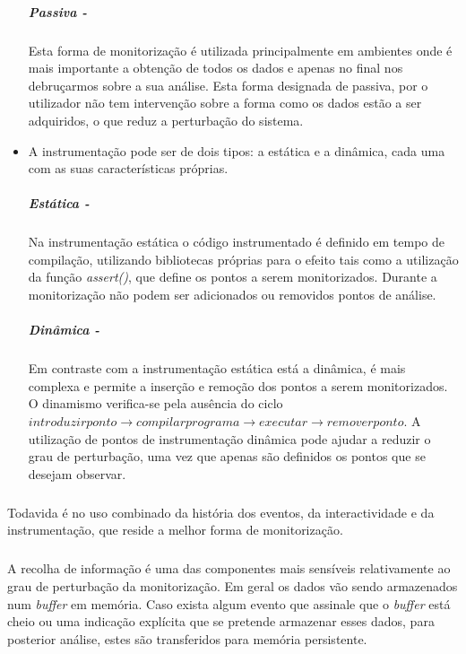 \begin{itemize}
\subparagraph*{Passiva - }
Esta forma de monitorização é utilizada principalmente em ambientes onde é mais importante a obtenção de todos os dados e apenas no final nos debruçarmos sobre a sua análise.
Esta forma designada de passiva, por o utilizador não tem intervenção sobre a forma como os dados estão a ser adquiridos, o que reduz a perturbação do sistema. 
\item

A instrumentação pode ser de dois tipos: a estática e a dinâmica, cada uma com as suas características próprias.

\subparagraph*{Estática - }

Na instrumentação estática o código instrumentado é definido em tempo de compilação, utilizando bibliotecas próprias para o efeito tais como a utilização da função \textit{assert()}, que define os pontos a serem monitorizados.
Durante a monitorização não podem ser adicionados ou removidos pontos de análise.

\subparagraph*{Dinâmica - }

Em contraste com a instrumentação estática está a dinâmica, é mais complexa e permite a inserção e remoção dos pontos a serem monitorizados.
O dinamismo verifica-se pela ausência do ciclo $introduzir ponto\rightarrow compilar programa\rightarrow executar\rightarrow remover ponto$.
A utilização de pontos de instrumentação dinâmica pode ajudar a reduzir o grau de perturbação, uma vez que apenas são definidos os pontos que se desejam observar.
\end{itemize}

\subparagraph*{}
Todavida é no uso combinado da história dos eventos, da interactividade e da instrumentação, que reside a melhor forma de monitorização.

\subparagraph*{
}
A recolha de informação é uma das componentes mais sensíveis relativamente ao grau de perturbação da monitorização.
Em geral os dados vão sendo armazenados num \textit{buffer} em memória.
Caso exista algum evento que assinale que o \textit{buffer} está cheio ou uma indicação explícita que se pretende armazenar esses dados, para posterior análise, estes são transferidos para memória persistente.

